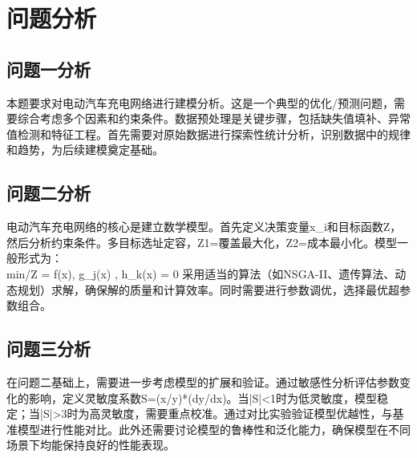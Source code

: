 \newpage
\section{问题分析}

\subsection{问题一分析}
本题要求对电动汽车充电网络进行建模分析。这是一个典型的优化/预测问题，需要综合考虑多个因素和约束条件。数据预处理是关键步骤，包括缺失值填补、异常值检测和特征工程。首先需要对原始数据进行探索性统计分析，识别数据中的规律和趋势，为后续建模奠定基础。

\subsection{问题二分析}
电动汽车充电网络的核心是建立数学模型。首先定义决策变量x_i和目标函数Z，然后分析约束条件。多目标选址定容，Z1=覆盖最大化，Z2=成本最小化。模型一般形式为：
\\min/\max \quad Z = f(x), \quad {} \quad g_j(x) , \; h_k(x) = 0
采用适当的算法（如NSGA-II、遗传算法、动态规划）求解，确保解的质量和计算效率。同时需要进行参数调优，选择最优超参数组合。

\subsection{问题三分析}
在问题二基础上，需要进一步考虑模型的扩展和验证。通过敏感性分析评估参数变化的影响，定义灵敏度系数S=(x/y)*(dy/dx)。当|S|<1时为低灵敏度，模型稳定；当|S|>3时为高灵敏度，需要重点校准。通过对比实验验证模型优越性，与基准模型进行性能对比。此外还需要讨论模型的鲁棒性和泛化能力，确保模型在不同场景下均能保持良好的性能表现。